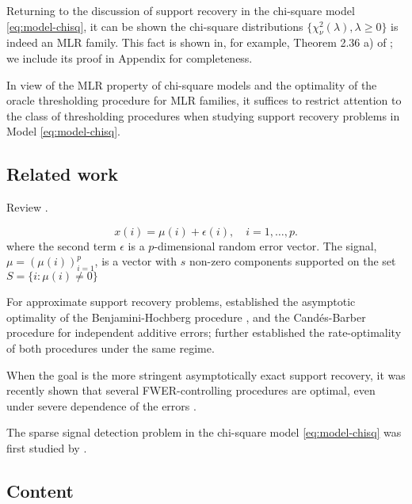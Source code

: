 Returning to the discussion of support recovery in the chi-square model \eqref{eq:model-chisq}, it can be shown the chi-square distributions $\{\chi^2_\nu(\lambda), \lambda\ge 0\}$ is indeed an MLR family.
This fact is shown in, for example, Theorem 2.36 a) of \cite{witting2013mathematische}; we include its proof in Appendix  for completeness.

In view of the MLR property of chi-square models and the optimality of the oracle thresholding procedure for MLR families, it suffices to restrict attention to the class of thresholding procedures when studying support recovery problems in Model \eqref{eq:model-chisq}.

\subsection{Related work}

Review \cite{jin2014optimality, jin2016rare, butucea2018variable, arias2017distribution, gao2018fundamental, ji2012ups, rabinovich2017optimal}.

\begin{equation} \label{eq:model-additive}
    x(i) = \mu(i) + \epsilon(i), \quad i=1,\ldots,p.
\end{equation}
where the second term $\epsilon$ is a $p$-dimensional random error vector. 
The signal, $\mu = (\mu(i))_{i=1}^p$, is a vector with $s$ non-zero components supported on the set $S=\{i:\mu(i)\neq 0\}$


For approximate support recovery problems, \citet*{arias2017distribution} established the asymptotic optimality of the Benjamini-Hochberg procedure \cite{benjamini1995controlling}, and the Cand\'es-Barber procedure \cite{barber2015controlling} for independent additive errors;
\citet{rabinovich2017optimal} further established the rate-optimality of both procedures under the same regime.

When the goal is the more stringent asymptotically exact support recovery, it was recently shown that several FWER-controlling procedures are optimal, even under severe dependence of the errors \cite{gao2018fundamental}.

The sparse signal detection problem in the chi-square model \eqref{eq:model-chisq} was first studied by \cite{donoho2004higher}.


\cite{gao2019upass}



\subsection{Content}